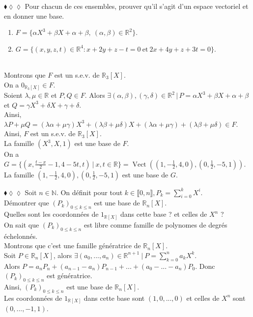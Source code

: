 \documentclass[11pt]{article}
\newcommand*{\R}{\mathbb{R}}
\newcommand*{\N}{\mathbb{N}}
\DeclareMathOperator*{\vect}{Vect}
\begin{document}
\begin{exercise}{$\blacklozenge\lozenge\lozenge$}{}
    Pour chacun de ces ensembles, prouver qu'il s'agit d'un espace vectoriel et en donner une base.
    \begin{enumerate}[topsep=0pt,itemsep=-0.9ex]
        \item $F = \{\alpha X^3 + \beta X + \alpha + \beta, ~ (\alpha, \beta) \in \R^2\}$.
        \item $G = \{(x,y,z,t) \in \R^4 : x + 2y + z - t = 0 ~ \text{et} ~ 2x + 4y + z + 3t = 0\}$.
    \end{enumerate}
    \tcblower\\[0.2cm]
     Montrons que $F$ est un s.e.v. de $\R_3[X]$.\\
    On a $0_{\R_3[X]} \in F$.\\
    Soient $\lambda, \mu \in \R$ et $P, Q \in F$.
    Alors $\exists (\alpha, \beta), (\gamma, \delta) \in \R^2 \, | \,  P = \alpha X^3 + \beta X + \alpha + \beta$ et $Q = \gamma X^3 + \delta X + \gamma + \delta$.\\
    Ainsi, $\lambda P + \mu Q = (\lambda\alpha + \mu\gamma)X^3 + (\lambda\beta + \mu\delta)X + (\lambda\alpha + \mu\gamma) + (\lambda\beta + \mu\delta) \in F$.\\
    Ainsi, $F$ est un s.e.v. de $\R_3[X]$.\\
    La famille $(X^3, X, 1)$ est une base de $F$.\\[0.3cm]
     On a $G = \{(x, \frac{t-x}{2} - 1, 4 - 5t, t) ~ | ~ x,t\in\R\} = \vect((1, -\frac{1}{2}, 4, 0), (0, \frac{1}{2}, -5, 1))$.\\
    La famille $(1, -\frac{1}{2}, 4, 0), (0, \frac{1}{2}, -5, 1)$ est une base de $G$.
\end{exercise}

\begin{exercise}{$\blacklozenge\lozenge\lozenge$}{}
    Soit $n \in \N$. On définit pour tout $k\in\llbracket 0, n \rrbracket, P_k = \sum\limits_{i=0}^k X^i$.\\
    Démontrer que $(P_k)_{0\leq k\leq n}$ est une base de $\R_n[X]$.\\
    Quelles sont les coordonnées de $1_{\R[X]}$ dans cette base ? et celles de $X^n$ ?
    \tcblower\\[0.2cm]
    On sait que $(P_k)_{0\leq k\leq n}$ est libre comme famille de polynomes de degrés échelonnés.\\
    Montrons que c'est une famille génératrice de $\R_n[X]$.\\
    Soit $P\in\R_n[X]$, alors $\exists (a_0, ..., a_n) \in \R^{n+1} ~ | ~ P = \sum_{k=0}^n a_kX^k$.\\
    Alors $P = a_n P_n + (a_{n-1} - a_n) P_{n-1} + ... + (a_0 - ... - a_n) P_0$. Donc $(P_k)_{0\leq k\leq n}$ est génératrice.\\
    Ainsi, $(P_k)_{0\leq k\leq n}$ est une base de $\R_n[X]$.\\
    Les coordonnées de $1_{\R[X]}$ dans cette base sont $(1, 0, ..., 0)$ et celles de $X^n$ sont $(0, ..., -1, 1)$.
\end{exercise}
\end{document}
